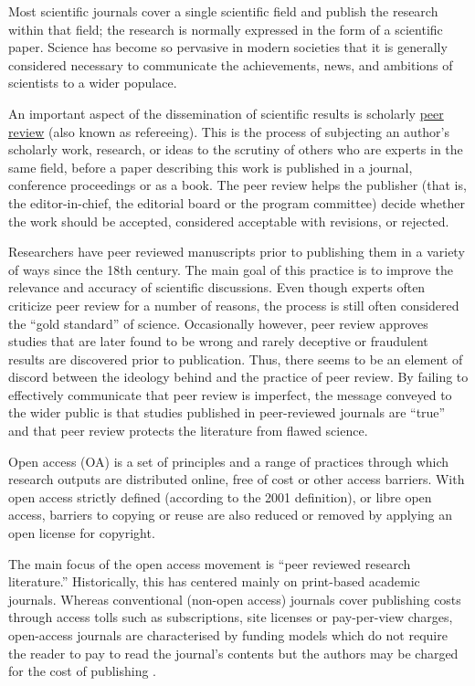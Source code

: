 Most scientific journals cover a single scientific field and publish the research within that field; the research is normally expressed in the form of a scientific paper. Science has become so pervasive in modern societies that it is generally considered necessary to communicate the achievements, news, and ambitions of scientists to a wider populace.

An important aspect of the dissemination of scientific results is scholarly \href{https://en.wikipedia.org/wiki/Peer_review}{peer review} (also known as refereeing). This is the process of subjecting an author's scholarly work, research, or ideas to the scrutiny of others who are experts in the same field, before a paper describing this work is published in a journal, conference proceedings or as a book. The peer review helps the publisher (that is, the editor-in-chief, the editorial board or the program committee) decide whether the work should be accepted, considered acceptable with revisions, or rejected.

Researchers have peer reviewed manuscripts prior to publishing them in a variety of ways since the 18th century. The main goal of this practice is to improve the relevance and accuracy of scientific discussions. Even though experts often criticize peer review for a number of reasons, the process is still often considered the ``gold standard'' of science. Occasionally however, peer review approves studies that are later found to be wrong and rarely deceptive or fraudulent results are discovered prior to publication. Thus, there seems to be an element of discord between the ideology behind and the practice of peer review. By failing to effectively communicate that peer review is imperfect, the message conveyed to the wider public is that studies published in peer-reviewed journals are ``true'' and that peer review protects the literature from flawed science.

Open access (OA) is a set of principles and a range of practices through which research outputs are distributed online, free of cost or other access barriers. With open access strictly defined (according to the 2001 definition), or libre open access, barriers to copying or reuse are also reduced or removed by applying an open license for copyright.

The main focus of the open access movement is ``peer reviewed research literature.'' Historically, this has centered mainly on print-based academic journals. Whereas conventional (non-open access) journals cover publishing costs through access tolls such as subscriptions, site licenses or pay-per-view charges, open-access journals are characterised by funding models which do not require the reader to pay to read the journal's contents but the authors may be charged for the cost of publishing .

